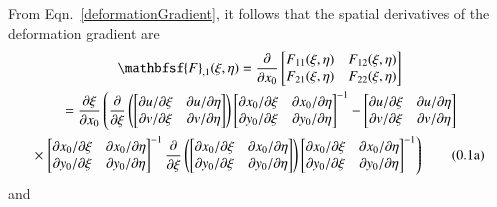 From Eqn.~\eqref{deformationGradient}, it follows that the spatial derivatives of the deformation gradient are
\begin{multline}
\mathbfsf{F}_{,1} (\xi, \eta) = \frac{\partial}{\partial x_0}
\begin{bmatrix}
F_{11}(\xi, \eta) & F_{12}(\xi, \eta) \\
F_{21}(\xi, \eta) & F_{22}(\xi, \eta)
\end{bmatrix} \\ 
\mbox{} = \frac{\partial \xi}{\partial x_0} \left( \frac{\partial}{\partial \xi} \left(
\begin{bmatrix}
\partial u / \partial \xi & \partial u / \partial \eta \\
\partial v / \partial \xi & \partial v / \partial \eta
\end{bmatrix} \right)
\begin{bmatrix}
\partial x_0 / \partial \xi & \partial x_0 / \partial \eta \\
\partial y_0 / \partial \xi & \partial y_0 / \partial \eta
\end{bmatrix}^{-1} -
\begin{bmatrix}
\partial u / \partial \xi & \partial u / \partial \eta \\
\partial v / \partial \xi & \partial v / \partial \eta
\end{bmatrix} \right. \\ \times \left.
\begin{bmatrix}
\partial x_0 / \partial \xi & \partial x_0 / \partial \eta \\
\partial y_0 / \partial \xi & \partial y_0 / \partial \eta
\end{bmatrix}^{-1}
\frac{\partial}{\partial \xi} \left(
\begin{bmatrix}
\partial x_0 / \partial \xi & \partial x_0 / \partial \eta \\
\partial y_0 / \partial \xi & \partial y_0 / \partial \eta
\end{bmatrix} \right)
\begin{bmatrix}
\partial x_0 / \partial \xi & \partial x_0 / \partial \eta \\
\partial y_0 / \partial \xi & \partial y_0 / \partial \eta
\end{bmatrix}^{-1} \right)
\addtocounter{equation}{1}
\tag{\theequation a}
\end{multline}
and
